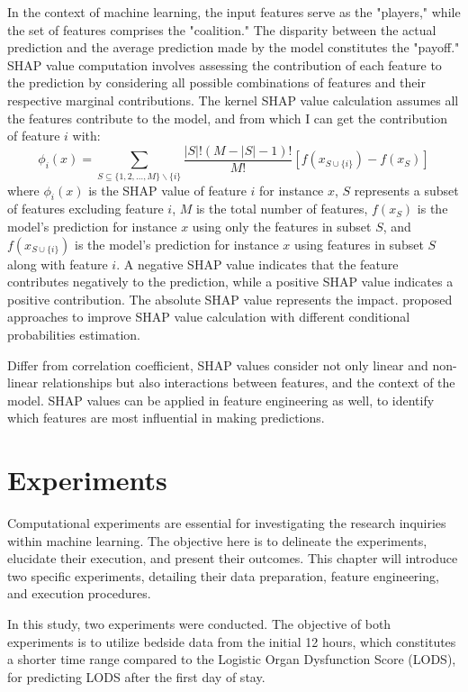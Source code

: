 \documentclass[12pt,a4paper,english
]{tunithesis}
\begin{document}
In the context of machine learning, the input features serve as the "players," while the set of features comprises the "coalition." The disparity between the actual prediction and the average prediction made by the model constitutes the "payoff." SHAP value computation involves assessing the contribution of each feature to the prediction by considering all possible combinations of features and their respective marginal contributions. The kernel SHAP value calculation assumes all the features contribute to the model, and from which I can get the contribution of feature $i$ with:
\begin{equation}
    \phi_i(x)=\sum_{S \subseteq\{1,2, \ldots, M\} \backslash\{i\}} \frac{|S| !(M-|S|-1) !}{M !}\left[f\left(x_{S \cup\{i\}}\right)-f\left(x_S\right)\right]
\end{equation}
where $\phi_i(x)$ is the SHAP value of feature $i$ for instance $x$, $S$ represents a subset of features excluding feature $i$, $M$ is the total number of features, $f(x_S)$  is the model's prediction for instance $x$ using only the features in subset $S$, and $f\left(x_{S \cup\{i\}}\right)$ is the model's prediction for instance $x$ using features in subset $S$ along with feature $i$. A negative SHAP value indicates that the feature contributes negatively to the prediction, while a positive SHAP value indicates a positive contribution. The absolute SHAP value represents the impact. \textcite{aas2020} proposed approaches to improve SHAP value calculation with different conditional probabilities estimation. 

Differ from correlation coefficient, SHAP values consider not only linear and non-linear relationships but also interactions between features, and the context of the model. SHAP values can be applied in feature engineering as well, to identify which features are most influential in making predictions.
 
\chapter{Experiments}
\label{ch:experiment}
Computational experiments are essential for investigating the research inquiries within machine learning. The objective here is to delineate the experiments, elucidate their execution, and present their outcomes. This chapter will introduce two specific experiments, detailing their data preparation, feature engineering, and execution procedures.

In this study, two experiments were conducted. The objective of both experiments is to utilize bedside data from the initial 12 hours, which constitutes a shorter time range compared to the Logistic Organ Dysfunction Score (LODS), for predicting LODS after the first day of stay.
\end{document}

